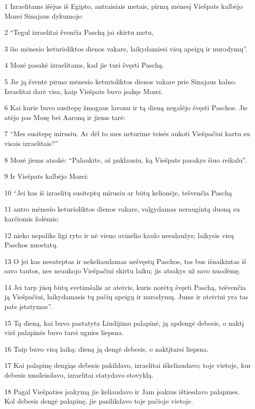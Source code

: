 \par 1 Izraelitams išėjus iš Egipto, antraisiais metais, pirmą mėnesį Viešpats kalbėjo Mozei Sinajaus dykumoje: 
\par 2 “Tegul izraelitai švenčia Paschą jai skirtu metu, 
\par 3 šio mėnesio keturioliktos dienos vakare, laikydamiesi visų apeigų ir nurodymų”. 
\par 4 Mozė pasakė izraelitams, kad jie turi švęsti Paschą. 
\par 5 Jie ją šventė pirmo mėnesio keturioliktos dienos vakare prie Sinajaus kalno. Izraelitai darė visa, kaip Viešpats buvo įsakęs Mozei. 
\par 6 Kai kurie buvo susitepę žmogaus lavonu ir tą dieną negalėjo švęsti Paschos. Jie atėjo pas Mozę bei Aaroną ir jiems tarė: 
\par 7 “Mes susitepę mirusiu. Ar dėl to mes neturime teisės aukoti Viešpačiui kartu su visais izraelitais?” 
\par 8 Mozė jiems atsakė: “Palaukite, aš paklausiu, ką Viešpats pasakys šiuo reikalu”. 
\par 9 Ir Viešpats kalbėjo Mozei: 
\par 10 “Jei kas iš izraelitų susiteptų mirusiu ar būtų kelionėje, tešvenčia Paschą 
\par 11 antro mėnesio keturioliktos dienos vakare, valgydamas neraugintą duoną su karčiomis žolėmis; 
\par 12 nieko nepaliks ligi ryto ir nė vieno avinėlio kaulo nesulaužys; laikysis visų Paschos nuostatų. 
\par 13 O jei kas nesuteptas ir nekeliaudamas nešvęstų Paschos, tas bus išnaikintas iš savo tautos, nes neaukojo Viešpačiui skirtu laiku; jis atsakys už savo nuodėmę. 
\par 14 Jei tarp jūsų būtų svetimšalis ar ateivis, kuris norėtų švęsti Paschą, tešvenčia ją Viešpačiui, laikydamasis tų pačių apeigų ir nurodymų. Jums ir ateiviui yra tas pats įstatymas”. 
\par 15 Tą dieną, kai buvo pastatyta Liudijimo palapinė, ją apdengė debesis, o naktį virš palapinės buvo tarsi ugnies liepsna. 
\par 16 Taip buvo visą laiką: dieną ją dengė debesis, o naktį­tarsi liepsna. 
\par 17 Kai palapinę dengiąs debesis pakildavo, izraelitai iškeliaudavo; toje vietoje, kur debesis nusileisdavo, izraelitai statydavo stovyklą. 
\par 18 Pagal Viešpaties įsakymą jie keliaudavo ir Jam įsakius ištiesdavo palapines. Kol debesis dengė palapinę, jie pasilikdavo toje pačioje vietoje. 
